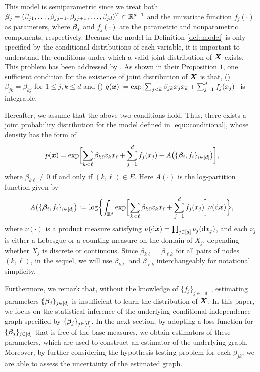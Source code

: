 \documentclass[twoside,11pt]{article}
\newcommand{\defeq}{\vcentcolon=}
\newcommand*{\BR}{\mathbb{R}}
\newcommand{\rmnum}[1]{\romannumeral #1}
\begin{document}
This model is semiparametric since we treat both $\bbeta_j= (\beta_{j1},\ldots, \beta_{jj-1}, \beta_{jj+1}, \ldots, \beta_{jd})^T\in\BR^{d-1}$ and the univariate function $f_j(\cdot)$ as parameters, where $\bm{\beta}_j$ and $f_j(\cdot )$ are the parametric and nonparametric components, respectively. 
Because the model in Definition \ref{def::model} is only specified by the conditional distributions  of each variable, it is important to understand the conditions under which a valid joint distribution of $\bm{X}$ exists. This problem has been addressed by \cite{chen2013selection}. As shown in their Proposition $1$, one sufficient condition for the existence of joint distribution of $\bm{X}$ is that, (\rmnum{1})
$\beta_{jk}  =   \beta_{kj}$ for $1\leq j , k\leq d$ and  (\rmnum{2}) $g(\bx)\defeq \exp \bigl  [\sum_{j<k}  \beta_{jk} x_j x_k +  \sum_{j=1}^d f_j(x_j) \bigr ]$ is integrable.

Hereafter, we  assume that  the above two conditions   hold. Thus,   there exists  a joint probability distribution for the model defined in \eqref{equ::conditional}, whose density has the form of 
\begin{align}\label{equ::joint}
 p(\bm{x} ) = \exp\biggl[ \sum_{k<\ell} \beta_{k\ell} x_k x_\ell +  \sum\limits_{j =1}^d f_j(x_j)  - A \bigl( \{\bm{\beta}_i, f_i\}_{i\in [d]}\bigr)\biggr],
\end{align}
where $\beta_{k\ell}\neq 0$ if and only if $(k,\ell)\in E$.  Here $ A(\cdot)$ is  the log-partition function  given by 
\begin{align}\label{log partition}
A \bigl( \{\bbeta_i, f_i\}_{i\in [d]}\bigr):= \log \biggl\{\int_{ \BR^d}\exp \biggl [\sum_{k<\ell} \beta_{k\ell} x_k x_\ell + \sum\limits_{j=1}^d  f_j(x_j)\biggr ]  \nu(\ud\bx)\biggr\},
\end{align}
where  $\nu(\cdot ) $ is a  product measure   satisfying $\nu({\mathrm{d}} \bm{x} ) = \prod_{j \in [d]} \nu_j ({\mathrm{d}} x_j)$, and each $\nu_j$ is   either a Lebesgue or a counting measure on the domain of $X_j$, depending whether $X_j$ is discrete or continuous. Since $\beta_{k\ell} = \beta_{\ell k}$ for all pairs of nodes $(k,\ell)$, in the sequel, we will use $\beta_{k\ell} $ and $\beta_{\ell k}$ interchangeably for notational simplicity.

Furthermore, we remark that,   without the knowledge of  $\{ f_j\}_{j \in [d]}$, estimating parameters $\{ \bm{\beta}_j \}_{j \in [d]}$ is insufficient to learn the distribution of $\bm{X}$. In this paper, we focus on the statistical inference of the underlying conditional independence graph specified by $\{ \bm{\beta}_j \}_{j \in [d]}$. In the next section, by adopting a loss function for  $\{ \bm{\beta}_j \}_{j \in [d]}$ that is free of the base measures, we 
obtain estimators of these parameters, which are used to construct an estimator of the underlying graph. Moreover, by further considering the hypothesis testing  problem for each $\beta_{jk}$, we 
are able  to assess  the  uncertainty of the estimated graph.  
\end{document}
